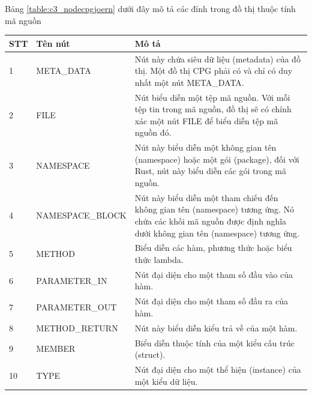 Bảng \ref{table:c3_nodecpgjoern} dưới đây mô tả các đỉnh trong đồ thị thuộc tính mã nguồn

\footnotesize
\begin{longtable}{| p{} | p{} | p{} |}
\hline
\textbf{STT} & \textbf{Tên nút} & \textbf{Mô tả} \\ \hline
1   & META\_DATA         & Nút này chứa siêu dữ liệu (metadata) của đồ thị. Một đồ thị CPG phải có và chỉ có duy nhất một nút META\_DATA.                                                   \\ \hline
2   & FILE              & Nút biểu diễn một tệp mã nguồn. Với mỗi tệp tin trong mã nguồn, đồ thị sẽ có chính xác một nút FILE để biểu diễn tệp mã nguồn đó.                               \\ \hline
3   & NAMESPACE         & Nút này biểu diễn một không gian tên (namespace) hoặc một gói (package), đối với Rust, nút này biểu diễn các gói trong mã nguồn.                                  \\ \hline
4   & NAMESPACE\_BLOCK   & Nút này biểu diễn một tham chiếu đến không gian tên (namespace) tương ứng. Nó chứa các khối mã nguồn được định nghĩa dưới không gian tên (namespace) tương ứng. \\ \hline
5   & METHOD            & Biểu diễn các hàm, phương thức hoặc biểu thức lambda.                                                                                                           \\ \hline
6   & PARAMETER\_IN      & Nút đại diện cho một tham số đầu vào của hàm.                                                                                                                   \\ \hline
7   & PARAMETER\_OUT     & Nút đại diện cho một tham số đầu ra của hàm.                                                                                                                    \\ \hline
8   & METHOD\_RETURN     & Nút này biểu diễn kiểu trả về của một hàm.                                                                                                                      \\ \hline
9   & MEMBER            & Biểu diễn thuộc tính của một kiểu cấu trúc (struct).                                                                                                            \\ \hline
10  & TYPE              & Nút đại diện cho một thể hiện (instance) của một kiểu dữ liệu.                                                                                                  \\ \hline

\end{longtable}
